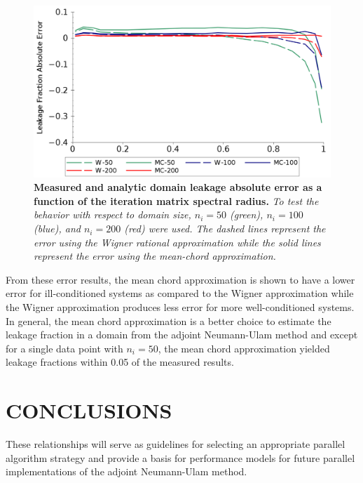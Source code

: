 \documentclass{mc2013}
\begin{document}
\begin{figure}[ht!]
  \begin{spacing}{1.0}
    \begin{center}
      \includegraphics[width=5in,clip]{leakage_error.png}
    \end{center}
    \caption{\textbf{Measured and analytic domain leakage absolute error
        as a function of the iteration matrix spectral radius.}
      \textit{To test the behavior with respect to domain size, $n_i=50$
        (green), $n_i=100$ (blue), and $n_i=200$ (red) were used. The
        dashed lines represent the error using the Wigner rational
        approximation while the solid lines represent the error using
        the mean-chord approximation.}}
    \label{fig:leakage_error}
  \end{spacing}
\end{figure}
From these error results, the mean chord approximation is
shown to have a lower error for ill-conditioned systems as compared
to the Wigner approximation while the Wigner approximation produces
less error for more well-conditioned systems. In general, the mean
chord approximation is a better choice to estimate the leakage
fraction in a domain from the adjoint Neumann-Ulam method and except
for a single data point with $n_i=50$, the mean chord approximation
yielded leakage fractions within 0.05 of the measured results.

\section{CONCLUSIONS}

These relationships will serve as guidelines for selecting an
appropriate parallel algorithm strategy and provide a basis for
performance models for future parallel implementations of the adjoint
Neumann-Ulam method.
\end{document}
